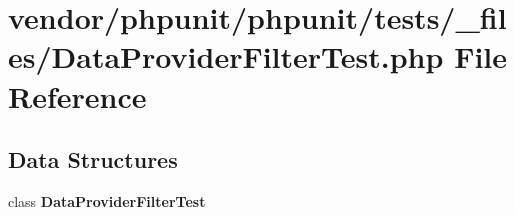 \section{vendor/phpunit/phpunit/tests/\+\_\+files/\+Data\+Provider\+Filter\+Test.php File Reference}
\label{_data_provider_filter_test_8php}
\subsection*{Data Structures}
\begin{DoxyCompactItemize}
\item 
class {\bf Data\+Provider\+Filter\+Test}
\end{DoxyCompactItemize}
